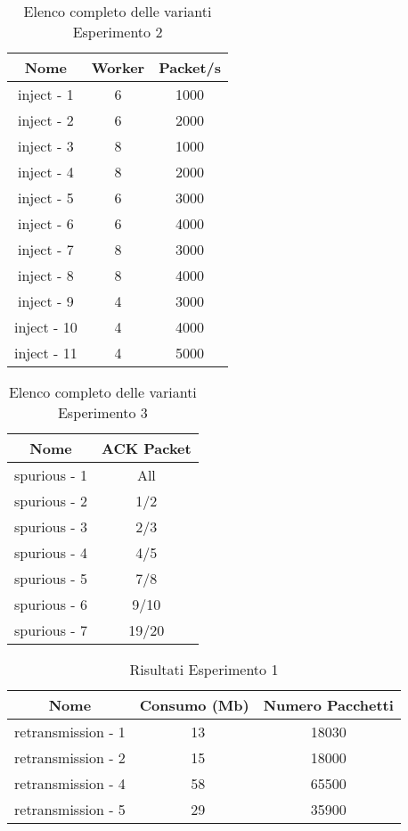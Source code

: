 \begin{table}[h!]
    \centering
    \caption*{Elenco completo delle varianti Esperimento 2}
    \begin{tabular}{|c|c|c|}
        \hline
        \textbf{Nome} & \textbf{Worker} & \textbf{Packet/s} \\
        \hline
        inject - 1 & 6 & 1000 \\
        \hline
        inject - 2 & 6 & 2000 \\
        \hline
        inject - 3 & 8 & 1000 \\
        \hline
        inject - 4 & 8 & 2000 \\
        \hline
        inject - 5 & 6 & 3000 \\
        \hline
        inject - 6 & 6 & 4000 \\
        \hline
        inject - 7 & 8 & 3000 \\
        \hline
        inject - 8 & 8 & 4000 \\
        \hline
        inject - 9 & 4 & 3000 \\
        \hline
        inject - 10 & 4 & 4000 \\
        \hline
        inject - 11 & 4 & 5000 \\
        \hline
    \end{tabular}
\end{table}

\begin{table}[h!]
    \centering
    \caption*{Elenco completo delle varianti Esperimento 3}
    \begin{tabular}{|c|c|}
        \hline
        \textbf{Nome} & \textbf{ACK Packet} \\
        \hline
        spurious - 1  & All \\
        \hline
        spurious - 2 & 1/2 \\
        \hline
        spurious - 3 & 2/3 \\
        \hline
        spurious - 4 & 4/5 \\
        \hline
        spurious - 5 & 7/8 \\
        \hline
        spurious - 6 & 9/10 \\
        \hline
        spurious - 7 & 19/20 \\
        \hline
    \end{tabular}
\end{table}

\begin{table}[h!]
    \centering
    \caption*{Risultati Esperimento 1}
    \begin{tabular}{|c|c|c|}
        \hline
        \textbf{Nome} & \textbf{Consumo (Mb)} & \textbf{Numero Pacchetti} \\
        \hline
        retransmission - 1 & ~13 & 18030 \\
        \hline
        retransmission - 2 & ~15 & 18000 \\
        \hline
        retransmission - 4 & ~58 & 65500 \\
        \hline
        retransmission - 5 & ~29 & 35900 \\
        \hline
    \end{tabular}
\end{table}

